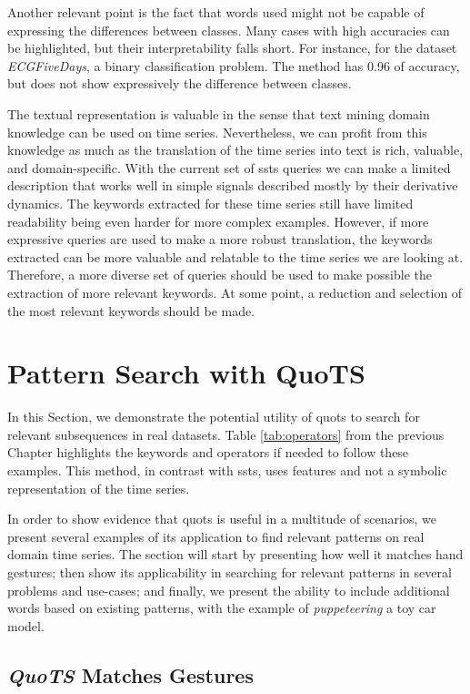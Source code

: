 Another relevant point is the fact that words used might not be capable of expressing the differences between classes. Many cases with high accuracies can be highlighted, but their interpretability falls short. For instance, for the dataset \textit{ECGFiveDays}, a binary classification problem. The method has 0.96 of accuracy, but does not show expressively the difference between classes.
\par
The textual representation is valuable in the sense that text mining domain knowledge can be used on time series. Nevertheless, we can profit from this knowledge as much as the translation of the time series into text is rich, valuable, and domain-specific. With the current set of \gls{ssts} queries we can make a limited description that works well in simple signals described mostly by their derivative dynamics. The keywords extracted for these time series still have limited readability being even harder for more complex examples. However, if more expressive queries are used to make a more robust translation, the keywords extracted can be more valuable and relatable to the time series we are looking at. Therefore, a more diverse set of queries should be used to make possible the extraction of more relevant keywords. At some point, a reduction and selection of the most relevant keywords should be made.

\section{Pattern Search with QuoTS}

In this Section, we demonstrate the potential utility of \gls{quots} to search for relevant subsequences in real datasets. Table \ref{tab:operators} from the previous Chapter highlights the keywords and operators if needed to follow these examples. This method, in contrast with \gls{ssts}, uses features and not a symbolic representation of the time series.
\par
In order to show evidence that \gls{quots} is useful in a multitude of scenarios, we present several examples of its application to find relevant patterns on real domain time series. The section will start by presenting how well it matches hand gestures; then show its applicability in searching for relevant patterns in several problems and use-cases; and finally, we present the ability to include additional words based on existing patterns, with the example of \textit{puppeteering} a toy car model.

\subsection{\textit{QuoTS} Matches Gestures}

